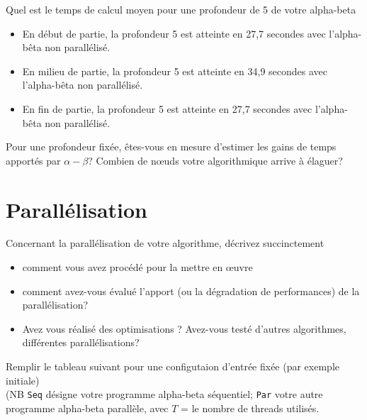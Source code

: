 \documentclass[a4paper, 11pt]{article}
\begin{document}
Quel est le temps de calcul moyen pour une profondeur de 5 de votre
alpha-beta 
\begin{itemize}
\item En début de partie, la profondeur 5 est atteinte en 27,7 secondes avec l'alpha-bêta non parallélisé.
\item En milieu de partie, la profondeur 5 est atteinte en 34,9 secondes avec l'alpha-bêta non parallélisé.
\item En fin de partie, la profondeur 5 est atteinte en 27,7 secondes avec l'alpha-bêta non parallélisé.
\end{itemize}

\vspace{.5cm}
Pour une profondeur fixée, êtes-vous en mesure d'estimer les gains de temps
apportés par $\alpha-\beta$? Combien de n\oe uds votre algorithmique arrive
à élaguer?

\vspace{2cm}

\section{Parallélisation}

Concernant la parallélisation de votre algorithme,
décrivez succinctement 
\begin{itemize}
\item comment vous avez procédé pour la mettre en œuvre
\item comment avez-vous évalué l'apport (ou la dégradation de
  performances) de la parallélisation?
\item Avez vous réalisé des optimisations ? Avez-vous testé d'autres
  algorithmes, différentes parallélisations?
\end{itemize}

Remplir le tableau suivant pour une  configutaion d'entrée fixée (par exemple initiale)  \\
(NB {\tt Seq} désigne votre programme alpha-beta séquentiel; {\tt Par} votre autre programme alpha-beta parallèle,
avec $T$ = le nombre de threads utilisés. 
\end{document}
